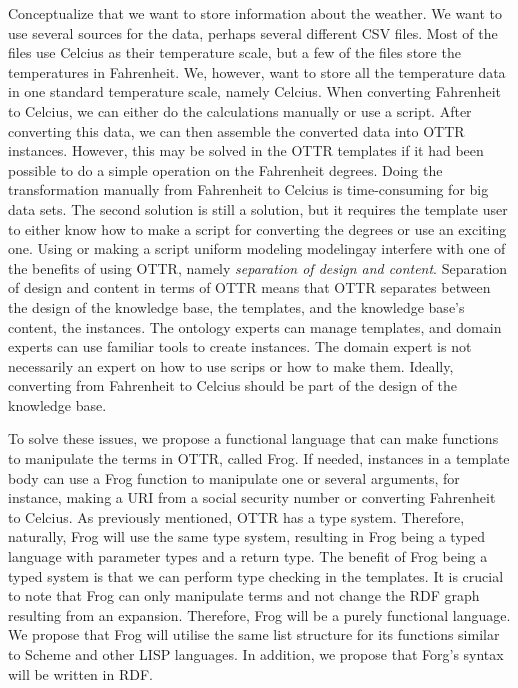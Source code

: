 \para
{} Conceptualize that we want to store information about the weather. We want to use several sources for the data, perhaps several different CSV files. Most of the files use Celcius as their temperature scale, but a few of the files store the temperatures in Fahrenheit. We, however, want to store all the temperature data in one standard temperature scale, namely Celcius. When converting Fahrenheit to Celcius, we can either do the calculations manually or use a script. After converting this data, we can then assemble the converted data into OTTR instances. However, this may be solved in the OTTR templates if it had been possible to do a simple operation on the Fahrenheit degrees. Doing the transformation manually from Fahrenheit to Celcius is time-consuming for big data sets. The second solution is still a solution, but it requires the template user to either know how to make a script for converting the degrees or use an exciting one. Using or making a script uniform modeling modelingay interfere with one of the benefits of using OTTR, namely \emph{separation of design and content}\autocite[9]{SLKK_OTTR_2021}. Separation of design and content in terms of OTTR means that OTTR separates between the design of the knowledge base, the templates, and the knowledge base's content, the instances. The ontology experts can manage templates, and domain experts can use familiar tools to create instances. The domain expert is not necessarily an expert on how to use scrips or how to make them. Ideally, converting from Fahrenheit to Celcius should be part of the design of the knowledge base.  

\para
To solve these issues, we propose a functional language that can make functions to manipulate the terms in OTTR, called Frog. If needed, instances in a template body can use a Frog function to manipulate one or several arguments, for instance,  making a URI from a social security number or converting Fahrenheit to Celcius. As previously mentioned, OTTR has a type system. Therefore, naturally, Frog will use the same type system, resulting in Frog being a typed language with parameter types and a return type.  The benefit of Frog being a typed system is that we can perform type checking in the templates. It is crucial to note that Frog can only manipulate terms and not change the RDF graph resulting from an expansion. Therefore, Frog will be a purely functional language. We propose that Frog will utilise the same list structure for its functions similar to Scheme and other LISP languages. In addition, we propose that Forg's syntax will be written in RDF.

